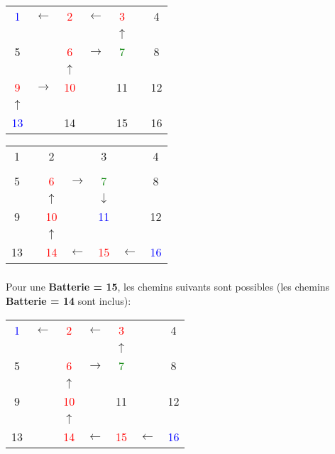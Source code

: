 \documentclass[12pt]
{report}
\newcommand\tab[1][1cm]{\hspace*{#1}}
\begin{document}
\begin{center}
\begin{tabular}{|ccccccc|}
\hline
\textcolor{blue}{1} &$\leftarrow$ & \textcolor{red}{2} &$\leftarrow$ & \textcolor{red}{3} & & 4 \\
&&&&$\uparrow$&& \\
5 & & \textcolor{red}{6} &$\rightarrow$& \textcolor{green}{7} & & 8 \\
&&$\uparrow$&&&& \\
\textcolor{red}{9} &$\rightarrow$& \textcolor{red}{10} & & 11 & & 12 \\
$\uparrow$&&&&&& \\
\textcolor{blue}{13} & & 14 & & 15 & & 16 \\
\hline
\end{tabular}
\end{center}

\begin{center}
\begin{tabular}{|ccccccc|}
\hline
1 & & 2 & & 3 &  & 4 \\
&&&&&& \\
5 & & \textcolor{red}{6} &$\rightarrow$& \textcolor{green}{7} &  & 8 \\
&&$\uparrow$&&$\downarrow$&& \\
9 & & \textcolor{red}{10} & & \textcolor{blue}{11} &  & 12 \\
&&$\uparrow$&&&& \\
13 & & \textcolor{red}{14} &$\leftarrow$& \textcolor{red}{15} &$\leftarrow$& \textcolor{blue}{16} \\
\hline
\end{tabular}
\end{center}


\subparagraph*{}
\tab Pour une \textbf{Batterie = 15}, les chemins suivants sont possibles (les chemins \textbf{Batterie = 14} sont inclus):\\

\begin{center}
\begin{tabular}{|ccccccc|}
\hline
\textcolor{blue}{1} &$\leftarrow$ & \textcolor{red}{2} &$\leftarrow$ & \textcolor{red}{3} & & 4 \\
&&&&$\uparrow$&& \\
5 & & \textcolor{red}{6} &$\rightarrow$& \textcolor{green}{7} &  & 8 \\
&&$\uparrow$&&&& \\
9 & & \textcolor{red}{10} & & 11 &  & 12 \\
&&$\uparrow$&&&& \\
13 & & \textcolor{red}{14} &$\leftarrow$& \textcolor{red}{15} &$\leftarrow$& \textcolor{blue}{16} \\
\hline
\end{tabular}
\end{center}
\end{document}
